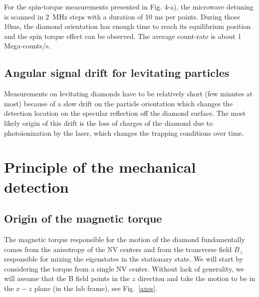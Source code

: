 \documentclass[preprintnumbers,amsmath,amssymb,onecolumn,12pt]{revtex4}
\newcommand{\be}{\begin{equation}}
\newcommand{\ee}{\end{equation}}
\begin{document}
For the spin-torque measurements presented in Fig. 4-a), the microwave detuning is scanned in 2~MHz steps with a duration of 10 ms per points. During those 10ms, the diamond orientation has enough time to reach its equilibrium position and the spin torque effect can be observed. The average count-rate is about 1 Mega-counts/s. 

\subsection{Angular signal drift for levitating particles}

Measurements on levitating diamonds have to be relatively short (few minutes at most) because of a slow drift on the particle orientation which changes the detection location on the specular reflection off the diamond surface. The most likely origin of this drift is the loss of charges of the diamond due to photoionization by the laser, which changes the trapping conditions over time.



%

\section{Principle of the mechanical detection}


\subsection{Origin of the magnetic torque}

The magnetic torque responsible for the motion of the diamond fundamentally comes from the anisotropy of the NV centers and from the transverse field $B_\perp$ responsible for mixing the eigenstates in the stationary state. We will start by considering the torque from a single NV center.
Without lack of generality, we will assume that the B field points in the $z$ direction and take the motion to be in the $x-z$ plane (in the lab frame), see Fig.~\ref{axes}.
\end{document}
